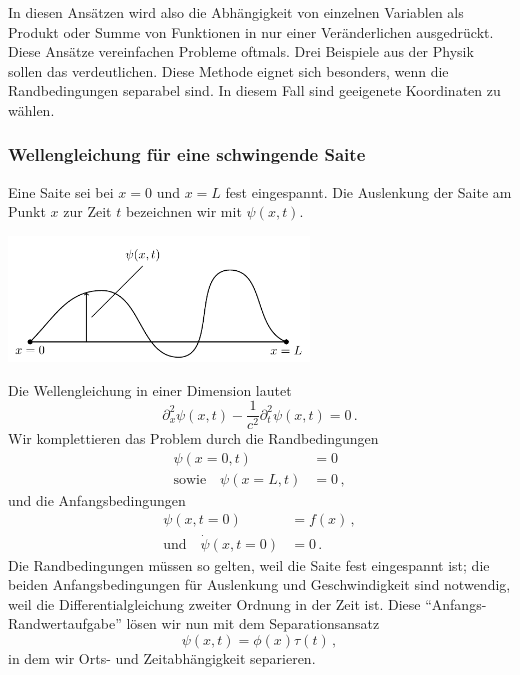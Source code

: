 \documentclass[paper=a4, fontsize=11.0pt, abstractoff, DIV12]{scrartcl}
\begin{document}
In diesen Ansätzen wird also die Abhängigkeit von einzelnen Variablen als
Produkt oder Summe von Funktionen in nur einer Veränderlichen ausgedrückt.
Diese Ansätze vereinfachen Probleme oftmals. Drei Beispiele aus der Physik sollen das verdeutlichen. Diese Methode eignet sich besonders, wenn die
Randbedingungen separabel sind. In diesem Fall sind geeigenete Koordinaten zu
wählen.

\subsubsection{Wellengleichung für eine schwingende Saite}

Eine Saite sei bei $x=0$ und $x=L$ fest eingespannt. Die Auslenkung der
Saite am Punkt $x$ zur Zeit $t$ bezeichnen wir mit $\psi(x, t)$.

\begin{center}
    \includegraphics[width=0.6\textwidth]{Figures/Schwing}
\end{center}


Die Wellengleichung in einer Dimension lautet
\begin{equation}
\partial_x^2 \psi(x, t) - \frac{1}{c^2}\partial_t^2 \psi(x,t) = 0\,.
\end{equation}
Wir komplettieren das Problem durch die Randbedingungen
\begin{align}
\psi(x=0,t) &= 0\\
\text{sowie}\quad\psi(x=L,t) &= 0\,,
\end{align}
und die Anfangsbedingungen
\begin{align}
\psi(x,t=0) &= f(x)\, ,\label{eq:AB1}\\
\text{und}\quad\dot{\psi}(x,t=0) &= 0\,.
\end{align}
Die Randbedingungen müssen so gelten, weil die Saite fest eingespannt ist;
die beiden Anfangsbedingungen für Auslenkung und Geschwindigkeit sind
notwendig, weil die Differentialgleichung zweiter Ordnung in der Zeit ist.
Diese ``Anfangs-Randwertaufgabe'' lösen wir nun mit dem Separationsansatz
\begin{equation}
\psi(x,t) = \phi(x)\tau(t)\,,
\end{equation}
in dem wir Orts- und Zeitabhängigkeit separieren.
\end{document}
